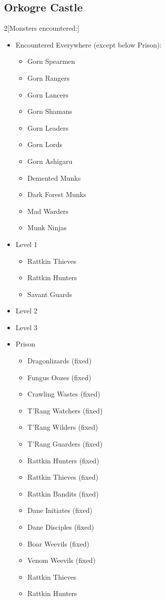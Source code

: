 \documentclass[10pt,twoside,openright]{report}
\providecommand{\tightlist}{%
  \setlength{\itemsep}{0pt}\setlength{\parskip}{0pt}}
\newcommand{\indexPlace}[1]{\index{#1}}
\newcommand{\place}[1]{#1\indexPlace{#1}}
\newenvironment{twocolumnitemize}[1]
 {%
  \begin{multicols}{2}[#1]
  \raggedcolumns\RaggedRight
  \begin{itemize}
 }
 {%
  \end{itemize}
  \end{multicols}
 }
\begin{document}
\pagebreak\subsection{\place{Orkogre Castle}}\label{orkogre-castle}\nopagebreak%
%
\begin{twocolumnitemize}{Monsters encountered:}
\item Encountered Everywhere (except below Prison):

\begin{itemize}
\tightlist
\item
  Gorn Spearmen
\item
  Gorn Rangers
\item
  Gorn Lancers
\item
  Gorn Shamans
\item
  Gorn Leaders
\item
  Gorn Lords
\item
  Gorn Ashigaru
\item
  Demented Munks
\item
  Dark Forest Munks
\item
  Mad Warders
\item
  Munk Ninjas
\end{itemize}

\item Level 1

\begin{itemize}
\tightlist
\item
  Rattkin Thieves
\item
  Rattkin Hunters
\item
  Savant Guards
\end{itemize}

\item Level 2

\item Level 3

\item Prison

\begin{itemize}
\tightlist
\item
  Dragonlizards (fixed)
\item
  Fungus Oozes (fixed)
\item
  Crawling Wastes (fixed)
\item
  T'Rang Watchers (fixed)
\item
  T'Rang Wilders (fixed)
\item
  T'Rang Guarders (fixed)
\item
  Rattkin Hunters (fixed)
\item
  Rattkin Thieves (fixed)
\item
  Rattkin Bandits (fixed)
\item
  Dane Initiates (fixed)
\item
  Dane Disciples (fixed)
\item
  Boar Weevils (fixed)
\item
  Venom Weevils (fixed)
\item
  Rattkin Thieves
\item
  Rattkin Hunters
\end{itemize}


\end{twocolumnitemize}
\end{document}
